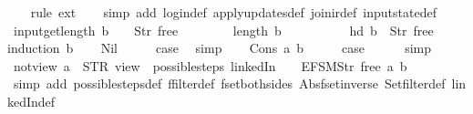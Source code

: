 \begin{isabellebody}
%
\isadelimproof
\ \ %
\endisadelimproof
%
\isatagproof
{}\isamarkupfalse%
\ {\isacharparenleft}rule\ ext{\isacharparenright}\isanewline
\ \ \isamarkupfalse%
\ {\isacharparenleft}simp\ add{\isacharcolon}\ login{\isacharunderscore}def\ apply{\isacharunderscore}updates{\isacharunderscore}def\ join{\isacharunderscore}ir{\isacharunderscore}def\ input{}state{\isacharunderscore}def{\isacharparenright}%
\endisatagproof
{\isafoldproof}%
%
\isadelimproof
\isanewline
%
\endisadelimproof
\isanewline
{}\isamarkupfalse%
\ input{\isacharunderscore}get{\isacharunderscore}length{\isacharcolon}\ {\isachardoublequoteopen}b\ {\isacharbang}\ {}\ {\isacharequal}\ Str\ {\isacharprime}{\isacharprime}free{\isacharprime}{\isacharprime}\ {\isasymLongrightarrow}\isanewline
\ \ \ \ \ \ \ length\ b\ {\isacharequal}\ {}\ {\isasymLongrightarrow}\isanewline
\ \ \ \ \ \ \ hd\ b\ {\isacharequal}\ Str\ {\isacharprime}{\isacharprime}free{\isacharprime}{\isacharprime}{\isachardoublequoteclose}\isanewline
%
\isadelimproof
%
\endisadelimproof
%
\isatagproof
{}\isamarkupfalse%
{\isacharparenleft}induction\ b{\isacharparenright}\isanewline
\ \ \isamarkupfalse%
\ Nil\isanewline
\ \ \isamarkupfalse%
\ \isamarkupfalse%
\ {\isacharquery}case\ \isamarkupfalse%
\ simp\isanewline
{}\isamarkupfalse%
\isanewline
\ \ \isamarkupfalse%
\ {\isacharparenleft}Cons\ a\ b{\isacharparenright}\isanewline
\ \ \isamarkupfalse%
\ \isamarkupfalse%
\ {\isacharquery}case\isanewline
\ \ \ \ \isamarkupfalse%
\ simp\isanewline
{}\isamarkupfalse%
%
\endisatagproof
{\isafoldproof}%
%
\isadelimproof
\isanewline
%
\endisadelimproof
\isanewline
{}\isamarkupfalse%
\ not{\isacharunderscore}view{\isacharcolon}\ {\isachardoublequoteopen}a\ {\isasymnoteq}\ STR\ {\isacharprime}{\isacharprime}view{\isacharprime}{\isacharprime}\ {\isasymLongrightarrow}\ possible{\isacharunderscore}steps\ linkedIn\ {}\ {\isacharless}{}\ {\isacharcolon}{\isacharequal}\ EFSM{\isachardot}Str\ {\isacharprime}{\isacharprime}free{\isacharprime}{\isacharprime}{\isachargreater}\ a\ b\ {\isacharequal}\ {\isacharbraceleft}{\isacharbar}{\isacharbar}{\isacharbraceright}{\isachardoublequoteclose}\isanewline
%
\isadelimproof
\ \ %
\endisadelimproof
%
\isatagproof
{}\isamarkupfalse%
\ {\isacharparenleft}simp\ add{\isacharcolon}\ possible{\isacharunderscore}steps{\isacharunderscore}def\ ffilter{\isacharunderscore}def\ fset{\isacharunderscore}both{\isacharunderscore}sides\ Abs{\isacharunderscore}fset{\isacharunderscore}inverse\ Set{\isachardot}filter{\isacharunderscore}def\ linkedIn{\isacharunderscore}def{\isacharparenright}\isanewline

\end{isabellebody}

